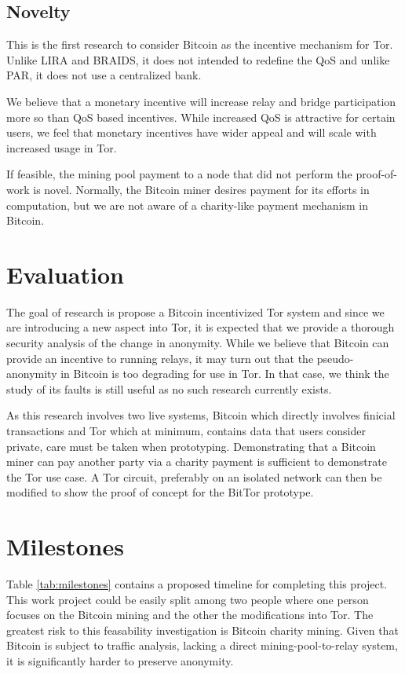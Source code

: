 \documentclass[letterpaper]{article}
\begin{document}
\subsection{Novelty}\label{sec:novelty}
This is the first research to consider Bitcoin as the incentive
mechanism for Tor.  Unlike LIRA and BRAIDS, it does not intended to
redefine the QoS and unlike PAR, it does not use a centralized bank.

We believe that a monetary incentive will increase relay and bridge
participation more so than QoS based incentives.  While increased QoS
is attractive for certain users, we feel that monetary incentives
have wider appeal and will scale with increased usage in Tor.

If feasible, the mining pool payment to a node that did not perform
the proof-of-work is novel.  Normally, the Bitcoin miner desires
payment for its efforts in computation, but we are not aware of a
charity-like payment mechanism in Bitcoin.


\section*{Evaluation}\label{sec:evaluation}

The goal of research is propose a Bitcoin incentivized Tor system and
since we are introducing a new aspect into Tor, it is expected that we
provide a thorough security analysis of the change in anonymity.
While we believe that Bitcoin can provide an incentive to running
relays, it may turn out that the pseudo-anonymity in Bitcoin is too
degrading for use in Tor.  In that case, we think the study of its
faults is still useful as no such research currently exists.

As this research involves two live systems, Bitcoin which directly
involves finicial transactions and Tor which at minimum, contains data
that users consider private, care must be taken when prototyping.
Demonstrating that a Bitcoin miner can pay another party via a charity
payment is sufficient to demonstrate the Tor use case.  A Tor circuit,
preferably on an isolated network can then be modified to show the
proof of concept for the BitTor prototype.


\section*{Milestones}\label{sec:milestones}

Table \ref{tab:milestones} contains a proposed timeline for completing
this project.  This work project could be easily split among two
people where one person focuses on the Bitcoin mining and the other
the modifications into Tor.  The greatest risk to this feasability
investigation is Bitcoin charity mining.  Given that Bitcoin is
subject to traffic analysis, lacking a direct mining-pool-to-relay
system, it is significantly harder to preserve anonymity.
\end{document}
